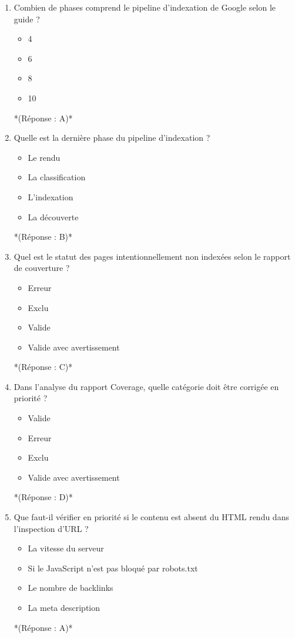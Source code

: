 \documentclass[12pt,a4paper,twoside]{report}
\begin{document}
\begin{enumerate}
\item Combien de phases comprend le pipeline d'indexation de Google selon le guide ?
\begin{itemize}
\item[A)] 4
\item[B)] 6
\item[C)] 8
\item[D)] 10
\end{itemize}
*(Réponse : A)*

\item Quelle est la dernière phase du pipeline d'indexation ?
\begin{itemize}
\item[A)] Le rendu
\item[B)] La classification
\item[C)] L'indexation
\item[D)] La découverte
\end{itemize}
*(Réponse : B)*

\item Quel est le statut des pages intentionnellement non indexées selon le rapport de couverture ?
\begin{itemize}
\item[A)] Erreur
\item[B)] Exclu
\item[C)] Valide
\item[D)] Valide avec avertissement
\end{itemize}
*(Réponse : C)*

\item Dans l'analyse du rapport Coverage, quelle catégorie doit être corrigée en priorité ?
\begin{itemize}
\item[A)] Valide
\item[B)] Erreur
\item[C)] Exclu
\item[D)] Valide avec avertissement
\end{itemize}
*(Réponse : D)*

\item Que faut-il vérifier en priorité si le contenu est absent du HTML rendu dans l'inspection d'URL ?
\begin{itemize}
\item[A)] La vitesse du serveur
\item[B)] Si le JavaScript n'est pas bloqué par robots.txt
\item[C)] Le nombre de backlinks
\item[D)] La meta description
\end{itemize}
*(Réponse : A)*


\end{enumerate}
\end{document}
